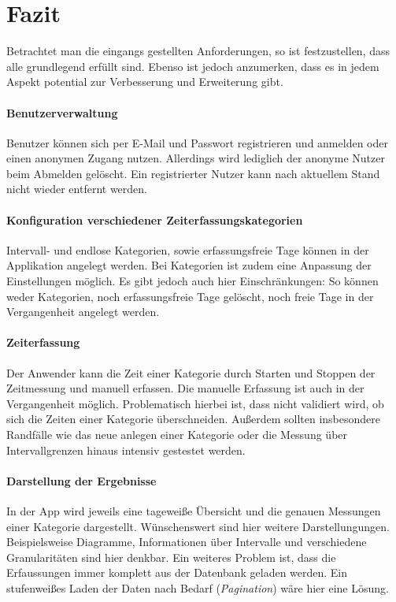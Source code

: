 \section{Fazit}\label{sec:fazit}
Betrachtet man die eingangs gestellten Anforderungen,
so ist festzustellen, dass alle grundlegend erfüllt sind.
Ebenso ist jedoch anzumerken, dass es in jedem Aspekt potential zur Verbesserung und Erweiterung gibt.

\paragraph{Benutzerverwaltung}
Benutzer können sich per E-Mail und Passwort registrieren und anmelden oder einen anonymen Zugang nutzen.
Allerdings wird lediglich der anonyme Nutzer beim Abmelden gelöscht.
Ein registrierter Nutzer kann nach aktuellem Stand nicht wieder entfernt werden.

\paragraph{Konfiguration verschiedener Zeiterfassungskategorien}
Intervall- und endlose Kategorien, sowie erfassungsfreie Tage können in der Applikation angelegt werden.
Bei Kategorien ist zudem eine Anpassung der Einstellungen möglich.
Es gibt jedoch auch hier Einschränkungen: So können weder Kategorien, noch erfassungsfreie Tage gelöscht,
noch freie Tage in der Vergangenheit angelegt werden.

\paragraph{Zeiterfassung}
Der Anwender kann die Zeit einer Kategorie durch Starten und Stoppen der Zeitmessung und manuell erfassen.
Die manuelle Erfassung ist auch in der Vergangenheit möglich.
Problematisch hierbei ist, dass nicht validiert wird, ob sich die Zeiten einer Kategorie überschneiden.
Außerdem sollten insbesondere Randfälle wie das neue anlegen einer Kategorie oder die Messung über Intervallgrenzen hinaus intensiv gestestet werden.

\paragraph{Darstellung der Ergebnisse}
In der App wird jeweils eine tageweiße Übersicht und die genauen Messungen einer Kategorie dargestellt.
Wünschenswert sind hier weitere Darstellungungen.
Beispielsweise Diagramme, Informationen über Intervalle und verschiedene Granularitäten sind hier denkbar.
Ein weiteres Problem ist, dass die Erfaussungen immer komplett aus der Datenbank geladen werden.
Ein stufenweißes Laden der Daten nach Bedarf (\emph{Pagination}) wäre hier eine Lösung.

